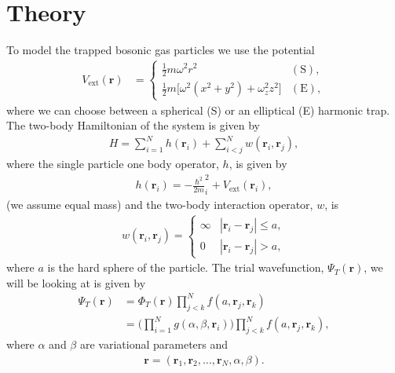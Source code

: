 \documentclass[
    a4paper, aps, twocolumn, floatfix, superscriptaddress, nofootinbib]{revtex4-1}
\newcommand{\vf}{\mathbf}
\newcommand{\1}{\mathds{1}}
\newcommand{\half}{\frac{1}{2}}
\begin{document}
\section{Theory}
    To model the trapped bosonic gas particles we use the potential
    \begin{align}
        V_{\text{ext}}(\vf{r})
        &=
        \begin{cases}
            \half m\omega^2r^2 & (\text{S}), \\
            \half m \bigl[
                \omega^2(x^2 + y^2) + \omega_z^2z^2
            \bigr] & (\text{E}),
        \end{cases}
    \end{align}
    where we can choose between a spherical (S) or an elliptical (E) harmonic
    trap. The two-body Hamiltonian of the system is given by
    \begin{align}
        H = \sum_{i = 1}^{N}h(\vf{r}_i) + \sum_{i < j}^{N}w(\vf{r}_i, \vf{r}_j),
    \end{align}
    where the single particle one body operator, $h$, is given by
    \begin{align}
        h(\vf{r}_i) = -\frac{\hbar^2}{2m}_i^2
        + V_{\text{ext}}(\vf{r}_i),
    \end{align}
    (we assume equal mass)
    and the two-body interaction operator, $w$, is
    \begin{align}
        w(\vf{r}_i, \vf{r}_j)
        = \begin{cases}
            \infty & |\vf{r}_i - \vf{r}_j| \leq a, \\
            0 & |\vf{r}_i - \vf{r}_j| > a,
        \end{cases}
    \end{align}
    where $a$ is the hard sphere of the particle. The trial wavefunction,
    $\Psi_T(\vf{r})$, we will be looking at is given by
    \begin{align}
        \Psi_T(\vf{r})
        &= \Phi_T(\vf{r})
        \prod_{j < k}^N f(a, \vf{r}_j, \vf{r}_k) \\
        &= \Biggl(
            \prod_{i = 1}^N g(\alpha, \beta, \vf{r}_i)
        \Biggr)
        \prod_{j < k}^N f(a, \vf{r}_j, \vf{r}_k),
        \label{eq:initial_trial_wavefunction}
    \end{align}
    where $\alpha$ and $\beta$ are variational parameters and
    \begin{align}
        \vf{r} = (\vf{r}_1, \vf{r}_2, \dots, \vf{r}_N, \alpha, \beta).
    \end{align}
\end{document}
